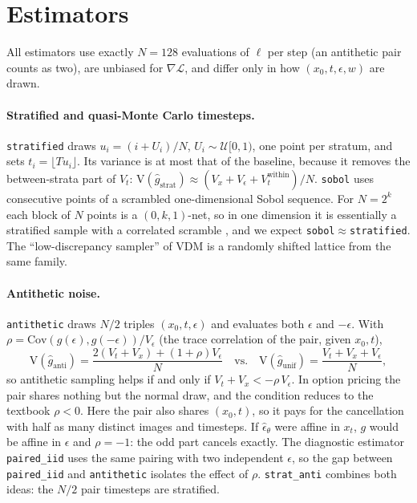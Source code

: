 \section{Estimators}
\label{sec:method}
All estimators use exactly $N=128$ evaluations of $\ell$ per step (an antithetic pair counts as two), are unbiased for
$\nabla\mathcal L$, and differ only in how $(x_0,t,\epsilon,w)$ are drawn.

\paragraph{Stratified and quasi-Monte Carlo timesteps.}
\texttt{stratified} draws $u_i=(i+U_i)/N$, $U_i\sim\mathcal U[0,1)$, one point per stratum, and sets
$t_i=\lfloor Tu_i\rfloor$. Its variance is at most that of the baseline, because it removes the between-strata
part of $V_t$: $\mathrm V(\hat g_{\text{strat}})\approx (V_x+V_\epsilon+V_t^{\text{within}})/N$.
\texttt{sobol} uses consecutive points of a scrambled one-dimensional Sobol sequence. For $N=2^k$ each block of
$N$ points is a $(0,k,1)$-net, so in one dimension it is essentially a stratified sample with a
correlated scramble \citep{owen1997scrambled}, and we expect \texttt{sobol}$\approx$\texttt{stratified}.
The ``low-discrepancy sampler'' of VDM \citep{kingma2021vdm} is a randomly shifted lattice from the same
family.

\paragraph{Antithetic noise.}
\texttt{antithetic} draws $N/2$ triples $(x_0,t,\epsilon)$ and evaluates both $\epsilon$ and $-\epsilon$. With
$\rho=\mathrm{Cov}(g(\epsilon),g(-\epsilon))/V_\epsilon$ (the trace correlation of the pair, given $x_0,t$),
\begin{equation}
  \mathrm V(\hat g_{\text{anti}})=\frac{2(V_t+V_x)+(1+\rho)V_\epsilon}{N}
  \quad\text{vs.}\quad
  \mathrm V(\hat g_{\text{unif}})=\frac{V_t+V_x+V_\epsilon}{N},
  \label{eq:anti}
\end{equation}
so antithetic sampling helps if and only if $V_t+V_x<-\rho\,V_\epsilon$. In option pricing the pair shares
nothing but the normal draw, and the condition reduces to the textbook $\rho<0$. Here the pair also
shares $(x_0,t)$, so it pays for the cancellation with half as many distinct images and timesteps. If
$\hat\epsilon_\theta$ were affine in $x_t$, $g$ would be affine in $\epsilon$ and $\rho=-1$: the odd part cancels
exactly. The diagnostic estimator \texttt{paired\_iid} uses the same pairing with two independent
$\epsilon$, so the gap between \texttt{paired\_iid} and \texttt{antithetic} isolates the effect of $\rho$.
\texttt{strat\_anti} combines both ideas: the $N/2$ pair timesteps are stratified.

